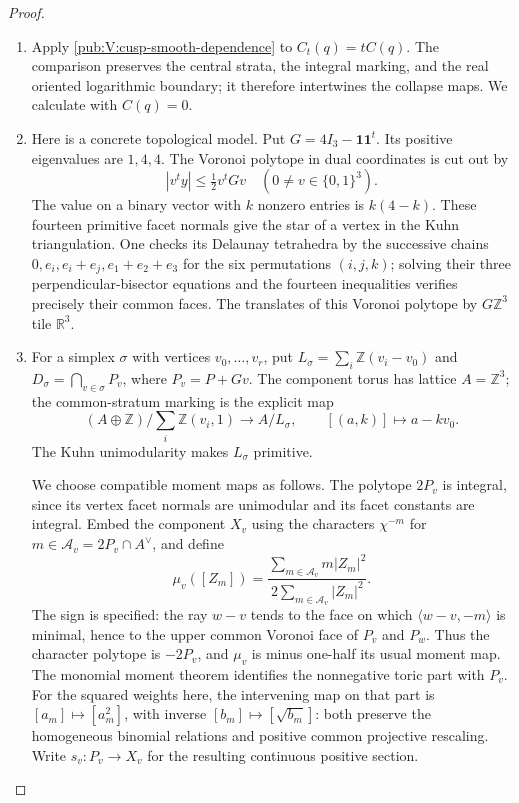 \begin{proof}
\begin{enumerate}[label={$\langle1\rangle$\arabic*.}]
\item Apply \cref{pub:V:cusp-smooth-dependence} to $C_t(q)=tC(q)$.
The comparison preserves the central strata, the integral marking,
and the real oriented logarithmic boundary; it therefore intertwines
the collapse maps. We calculate with $C(q)=0$.

\item Here is a concrete topological model.  Put $G=4I_3-\mathbf1\mathbf1^t$.
Its positive eigenvalues are $1,4,4$.  The Voronoi polytope in dual
coordinates is cut out by
\[
|v^ty|\leq \tfrac12v^tGv
 \quad (0\ne v\in\{0,1\}^3).
\]
The value on a binary vector with $k$ nonzero entries is $k(4-k)$.
These fourteen primitive facet normals give the star of a vertex in
the Kuhn triangulation.  One checks its Delaunay tetrahedra by the
successive chains
$0,e_i,e_i+e_j,e_1+e_2+e_3$ for the six permutations $(i,j,k)$;
solving their three perpendicular-bisector equations and the fourteen
inequalities verifies precisely their common faces.  The translates
of this Voronoi polytope by $G\mathbb Z^3$ tile $\mathbb R^3$.

\item For a simplex $\sigma$ with vertices $v_0,\ldots,v_r$, put
$L_\sigma=\sum_i\mathbb Z(v_i-v_0)$ and
$D_\sigma=\bigcap_{v\in\sigma}P_v$, where $P_v=P+Gv$.
The component torus has lattice $A=\mathbb Z^3$; the common-stratum
marking is the explicit map
\[
 (A\oplus\mathbb Z)/\sum_i\mathbb Z(v_i,1)
 \longrightarrow A/L_\sigma,\qquad
 [(a,k)]\longmapsto a-kv_0.
\]
The Kuhn unimodularity makes $L_\sigma$ primitive.

We choose compatible moment maps as follows.  The polytope $2P_v$
is integral, since its vertex facet normals are unimodular and its
facet constants are integral.  Embed the component $X_v$ using the
characters $\chi^{-m}$ for
$m\in\mathcal A_v=2P_v\cap A^\vee$, and define
\[
 \mu_v([Z_m])=
 \frac{\sum_{m\in\mathcal A_v}m|Z_m|^2}
 {2\sum_{m\in\mathcal A_v}|Z_m|^2}.
\]
The sign is specified: the ray $w-v$ tends to the face on which
$\langle w-v,-m\rangle$ is minimal, hence to the upper common
Voronoi face of $P_v$ and $P_w$.  Thus the character polytope is
$-2P_v$, and $\mu_v$ is minus one-half its usual moment map.
The monomial moment theorem
\cite[equations (12.2.3)--(12.2.4) and Theorem 12.2.5, p.~571]{CoxLittleSchenck2011}
identifies the nonnegative toric part with $P_v$.
For the squared weights here, the intervening map on that part is
$[a_m]\mapsto[a_m^2]$, with inverse $[b_m]\mapsto[\sqrt{b_m}]$:
both preserve the homogeneous binomial relations and positive common
projective rescaling.  Write $s_v:P_v\to X_v$ for the resulting
continuous positive section.


\end{enumerate}
\end{proof}
